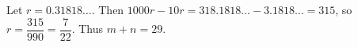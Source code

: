 Let $r=0.31818\ldots$. Then $1000r-10r=318.1818\ldots-3.1818\ldots=315$, so $r=\dfrac{315}{990}=\dfrac{7}{22}$. Thus $m+n=\boxed{29}$.
